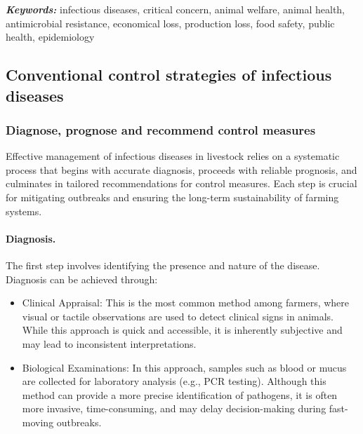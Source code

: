 \textit{\textbf{Keywords:}} infectious diseases, critical concern, animal welfare, animal health, antimicrobial resistance, economical loss, production loss, food safety, public health, epidemiology


\subsection{Conventional control strategies of infectious diseases}
\label{Conventional control strategies} %

\subsubsection{Diagnose, prognose and recommend control measures}

Effective management of infectious diseases in livestock relies on a systematic process that begins with accurate diagnosis, proceeds with reliable prognosis, and culminates in tailored recommendations for control measures. Each step is crucial for mitigating outbreaks and ensuring the long-term sustainability of farming systems.

\paragraph{Diagnosis.} The first step involves identifying the presence and nature of the disease. Diagnosis can be achieved through:
\begin{itemize}
    \item Clinical Appraisal: This is the most common method among farmers, where visual or tactile observations are used to detect clinical signs in animals. While this approach is quick and accessible, it is inherently subjective and may lead to inconsistent interpretations.
    \item Biological Examinations: In this approach, samples such as blood or mucus are collected for laboratory analysis (e.g., PCR testing). Although this method can provide a more precise identification of pathogens, it is often more invasive, time-consuming, and may delay decision-making during fast-moving outbreaks.
\end{itemize}


